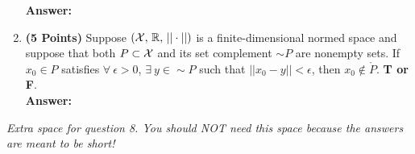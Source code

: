 \documentclass[letterpaper]{article}
\newcommand{\real}{\mathbb R}  %
\newcommand{\ds}{\displaystyle}
\begin{document}
\begin{enumerate}
    \textbf{Answer:}

        \vspace*{6cm}

    \item \textbf{(5 Points)} Suppose $({\cal X},\,\real,\, || \cdot||)$ is a finite-dimensional normed space and suppose that both $P\subset{\cal X}$ and its set complement $\sim P$ are nonempty sets.  If $x_0\in P$ satisfies $\forall~\epsilon>0$, $\exists~y \in \sim P$ such that $||x_0 - y||< \epsilon$, then  $x_0\not \in  \mathring{P}$. \textbf{ T or F}.\\

    \textbf{Answer:}






%
%



%



\end{enumerate}

\newpage
\textit{Extra space for question 8. You should NOT need this space because the answers are meant to be short!   }

\newpage

\end{document}
